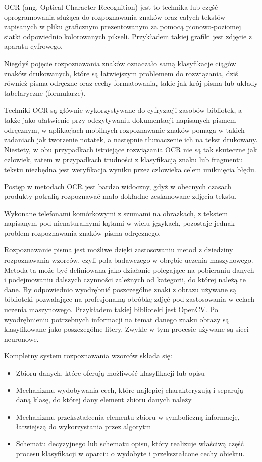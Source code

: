 \documentclass[brudnopis]{xmgr}
\begin{document}
OCR\cite{20} (ang. Optical Character Recognition) jest to technika lub część oprogramowania służąca do rozpoznawania znaków oraz całych tekstów zapisanych w pliku graficznym prezentowanym za pomocą pionowo-poziomej siatki odpowiednio kolorowanych pikseli. Przykładem takiej grafiki jest zdjęcie z aparatu cyfrowego. 

Niegdyś pojęcie rozpoznawania znaków oznaczało samą klasyfikacje ciągów znaków drukowanych, które są łatwiejszym problemem do rozwiązania, dziś również pisma odręczne oraz cechy formatowania, takie jak krój pisma lub układy tabelaryczne (formularze).

Techniki OCR są głównie wykorzystywane do cyfryzacji zasobów bibliotek, a także jako ułatwienie przy odczytywaniu dokumentacji napisanych pismem odręcznym, w aplikacjach mobilnych rozpoznawanie znaków pomaga w takich zadaniach jak tworzenie notatek, a następnie tłumaczenie ich na tekst drukowany. Niestety, w obu przypadkach istniejące rozwiązania OCR nie są tak skuteczne jak człowiek, zatem w przypadkach trudności z klasyfikacją znaku lub fragmentu tekstu niezbędna jest weryfikacja wyniku przez człowieka celem uniknięcia błędu.

Postęp w metodach OCR jest bardzo widoczny, gdyż w obecnych czasach produkty potrafią rozpoznawać mało dokładne zeskanowane zdjęcia tekstu.

Wykonane telefonami komórkowymi z szumami na obrazkach, z tekstem napisanym pod nienaturalnymi kątami w wielu językach, pozostaje jednak problem rozpoznawania znaków pisma odręcznego.

Rozpoznawanie pisma jest możliwe dzięki zastosowaniu metod z dziedziny rozpoznawania wzorców, czyli pola badawczego w obrębie uczenia maszynowego. Metoda ta może być definiowana jako działanie polegające na pobieraniu danych i podejmowaniu dalszych czynności zależnych od kategorii, do której należą te dane. By odpowiednio wyodrębnić poszczególne znaki z obrazu używane są biblioteki pozwalające na profesjonalną obróbkę zdjęć pod zastosowania w celach uczenia maszynowego. Przykładem takiej biblioteki jest OpenCV\cite{21}. Po wyodrębnieniu potrzebnych informacji na temat danego znaku obrazy są klasyfikowane jako poszczególne litery. Zwykle w tym procesie używane są sieci neuronowe.

Kompletny system rozpoznawania wzorców składa się:
\begin{itemize}
\item
Zbioru danych, które oferują możliwość klasyfikacji lub opisu
\item
Mechanizmu wydobywania cech, które najlepiej charakteryzują i separują daną klasę, do której dany element zbioru danych należy
\item
Mechanizmu przekształcenia elementu zbioru w symboliczną informację, łatwiejszą do wykorzystania przez algorytm
\item
Schematu decyzyjnego lub schematu opisu, który realizuje właściwą część procesu klasyfikacji w oparciu o wydobyte i przekształcone cechy obiektu.
\end{itemize}
\end{document}
